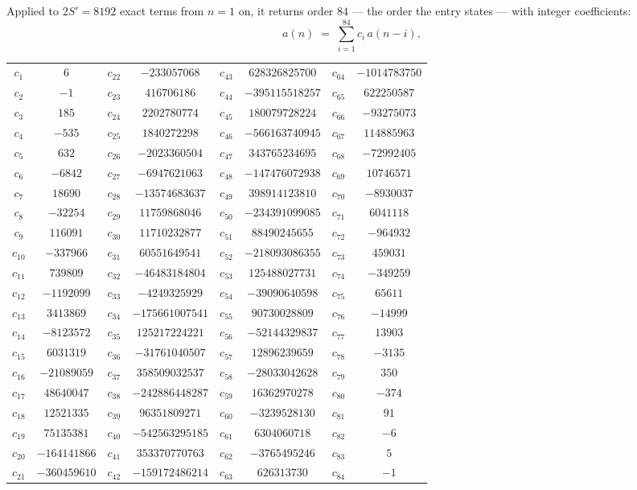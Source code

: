 \documentclass[11pt,a4paper]{article}
\theoremstyle{plain}
\theoremstyle{definition}
\begin{document}
Applied to $2S'=8192$ exact terms from $n=1$ on, it returns order $84$ --- the
order the entry states --- with integer coefficients:
\[
a(n)\;=\;\sum_{i=1}^{84}c_i\,a(n-i),
\]
\begin{center}\small
\begin{tabular}{cccccccc}
$c_{1}$ & $6$ & $c_{22}$ & $-233057068$ & $c_{43}$ & $628326825700$ & $c_{64}$ & $-1014783750$ \\
$c_{2}$ & $-1$ & $c_{23}$ & $416706186$ & $c_{44}$ & $-395115518257$ & $c_{65}$ & $622250587$ \\
$c_{3}$ & $185$ & $c_{24}$ & $2202780774$ & $c_{45}$ & $180079728224$ & $c_{66}$ & $-93275073$ \\
$c_{4}$ & $-535$ & $c_{25}$ & $1840272298$ & $c_{46}$ & $-566163740945$ & $c_{67}$ & $114885963$ \\
$c_{5}$ & $632$ & $c_{26}$ & $-2023360504$ & $c_{47}$ & $343765234695$ & $c_{68}$ & $-72992405$ \\
$c_{6}$ & $-6842$ & $c_{27}$ & $-6947621063$ & $c_{48}$ & $-147476072938$ & $c_{69}$ & $10746571$ \\
$c_{7}$ & $18690$ & $c_{28}$ & $-13574683637$ & $c_{49}$ & $398914123810$ & $c_{70}$ & $-8930037$ \\
$c_{8}$ & $-32254$ & $c_{29}$ & $11759868046$ & $c_{50}$ & $-234391099085$ & $c_{71}$ & $6041118$ \\
$c_{9}$ & $116091$ & $c_{30}$ & $11710232877$ & $c_{51}$ & $88490245655$ & $c_{72}$ & $-964932$ \\
$c_{10}$ & $-337966$ & $c_{31}$ & $60551649541$ & $c_{52}$ & $-218093086355$ & $c_{73}$ & $459031$ \\
$c_{11}$ & $739809$ & $c_{32}$ & $-46483184804$ & $c_{53}$ & $125488027731$ & $c_{74}$ & $-349259$ \\
$c_{12}$ & $-1192099$ & $c_{33}$ & $-4249325929$ & $c_{54}$ & $-39090640598$ & $c_{75}$ & $65611$ \\
$c_{13}$ & $3413869$ & $c_{34}$ & $-175661007541$ & $c_{55}$ & $90730028809$ & $c_{76}$ & $-14999$ \\
$c_{14}$ & $-8123572$ & $c_{35}$ & $125217224221$ & $c_{56}$ & $-52144329837$ & $c_{77}$ & $13903$ \\
$c_{15}$ & $6031319$ & $c_{36}$ & $-31761040507$ & $c_{57}$ & $12896239659$ & $c_{78}$ & $-3135$ \\
$c_{16}$ & $-21089059$ & $c_{37}$ & $358509032537$ & $c_{58}$ & $-28033042628$ & $c_{79}$ & $350$ \\
$c_{17}$ & $48640047$ & $c_{38}$ & $-242886448287$ & $c_{59}$ & $16362970278$ & $c_{80}$ & $-374$ \\
$c_{18}$ & $12521335$ & $c_{39}$ & $96351809271$ & $c_{60}$ & $-3239528130$ & $c_{81}$ & $91$ \\
$c_{19}$ & $75135381$ & $c_{40}$ & $-542563295185$ & $c_{61}$ & $6304060718$ & $c_{82}$ & $-6$ \\
$c_{20}$ & $-164141866$ & $c_{41}$ & $353370770763$ & $c_{62}$ & $-3765495246$ & $c_{83}$ & $5$ \\
$c_{21}$ & $-360459610$ & $c_{42}$ & $-159172486214$ & $c_{63}$ & $626313730$ & $c_{84}$ & $-1$ \\
\end{tabular}
\end{center}
\end{document}
